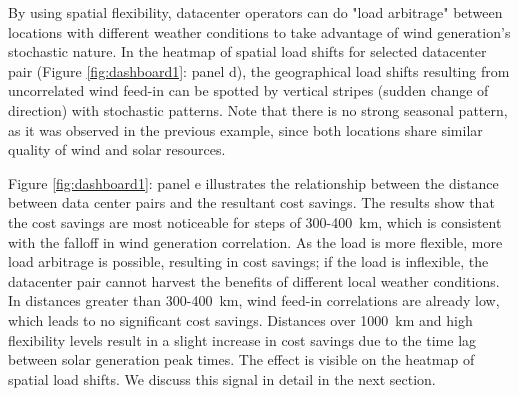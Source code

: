 By using spatial flexibility, datacenter operators can do "load arbitrage" between locations with different weather conditions to take advantage of wind generation's stochastic nature. In the heatmap of spatial load shifts for selected datacenter pair (Figure \ref{fig:dashboard1}: panel d), the geographical load shifts resulting from uncorrelated wind feed-in can be spotted by vertical stripes (sudden change of direction) with stochastic patterns. Note that there is no strong seasonal pattern, as it was observed in the previous example, since both locations share similar quality of wind and solar resources.

Figure \ref{fig:dashboard1}: panel e illustrates the relationship between the distance between data center pairs and the resultant cost savings. The results show that the cost savings are most noticeable for steps of 300-400~km, which is consistent with the falloff in wind generation correlation. As the load is more flexible, more load arbitrage is possible, resulting in cost savings; if the load is inflexible, the datacenter pair cannot harvest the benefits of different local weather conditions. In distances greater than 300-400~km, wind feed-in correlations are already low, which leads to no significant cost savings. Distances over 1000~km and high flexibility levels result in a slight increase in cost savings due to the time lag between solar generation peak times.  The effect is visible on the heatmap of spatial load shifts. We discuss this signal in detail in the next section.


